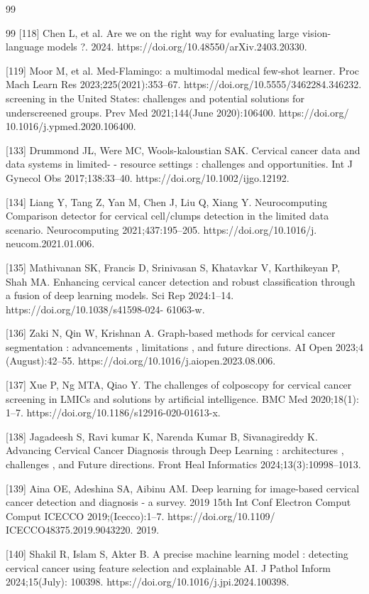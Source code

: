 \documentclass{svjour3}
\begin{document}
\begin{thebibliography}{99}
\begin{thebibliography}{99}
 [118] Chen L, et al. Are we on the right way for evaluating large vision-language models ?. 2024. https://doi.org/10.48550/arXiv.2403.20330.

 [119] Moor M, et al. Med-Flamingo: a multimodal medical few-shot learner. Proc Mach Learn Res 2023;225(2021):353–67. https://doi.org/10.5555/3462284.346232. screening in the United States: challenges and potential solutions for underscreened groups. Prev Med 2021;144(June 2020):106400. https://doi.org/ 10.1016/j.ypmed.2020.106400.

 [133] Drummond JL, Were MC, Wools-kaloustian SAK. Cervical cancer data and data systems in limited- - resource settings : challenges and opportunities. Int J Gynecol Obs 2017;138:33–40. https://doi.org/10.1002/ijgo.12192.

 [134] Liang Y, Tang Z, Yan M, Chen J, Liu Q, Xiang Y. Neurocomputing Comparison detector for cervical cell/clumps detection in the limited data scenario. Neurocomputing 2021;437:195–205. https://doi.org/10.1016/j. neucom.2021.01.006.

 [135] Mathivanan SK, Francis D, Srinivasan S, Khatavkar V, Karthikeyan P, Shah MA. Enhancing cervical cancer detection and robust classification through a fusion of deep learning models. Sci Rep 2024:1–14. https://doi.org/10.1038/s41598-024- 61063-w.

 [136] Zaki N, Qin W, Krishnan A. Graph-based methods for cervical cancer segmentation : advancements , limitations , and future directions. AI Open 2023;4 (August):42–55. https://doi.org/10.1016/j.aiopen.2023.08.006.

 [137] Xue P, Ng MTA, Qiao Y. The challenges of colposcopy for cervical cancer screening in LMICs and solutions by artificial intelligence. BMC Med 2020;18(1): 1–7. https://doi.org/10.1186/s12916-020-01613-x.

 [138] Jagadeesh S, Ravi kumar K, Narenda Kumar B, Sivanagireddy K. Advancing Cervical Cancer Diagnosis through Deep Learning : architectures , challenges , and Future directions. Front Heal Informatics 2024;13(3):10998–1013.

 [139] Aina OE, Adeshina SA, Aibinu AM. Deep learning for image-based cervical cancer detection and diagnosis - a survey. 2019 15th Int Conf Electron Comput Comput ICECCO 2019;(Icecco):1–7. https://doi.org/10.1109/ ICECCO48375.2019.9043220. 2019.

 [140] Shakil R, Islam S, Akter B. A precise machine learning model : detecting cervical cancer using feature selection and explainable AI. J Pathol Inform 2024;15(July): 100398. https://doi.org/10.1016/j.jpi.2024.100398.


\end{thebibliography}
\end{thebibliography}
\end{document}
